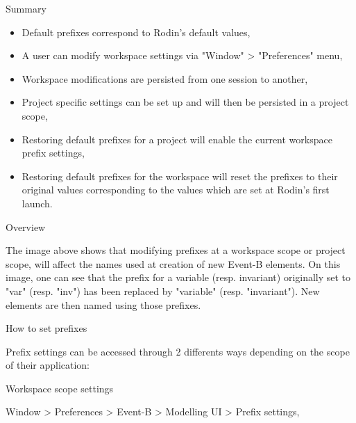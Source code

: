 Summary

\begin{itemize}
	\item Default prefixes correspond to Rodin's default values,
	\item A user can modify workspace settings via "Window" > "Preferences" menu,
	\item Workspace modifications are persisted from one session to another,
	\item Project specific settings can be set up and will then be persisted in a project scope,
	\item Restoring default prefixes for a project will enable the current workspace prefix settings,
	\item Restoring default prefixes for the workspace will reset the prefixes to their original values corresponding to the values which are set at Rodin's first launch. 
\end{itemize}

Overview 


The image above shows that modifying prefixes at a workspace scope or project scope, will affect the names used at creation of new Event-B elements. On this image, one can see that the prefix for a variable (resp. invariant) originally set to "var" (resp. "inv") has been replaced by "variable" (resp. "invariant"). New elements are then named using those prefixes.

How to set prefixes

Prefix settings can be accessed through 2 differents ways depending on the scope of their application:

Workspace scope settings

Window > Preferences > Event-B > Modelling UI > Prefix settings, 
    

